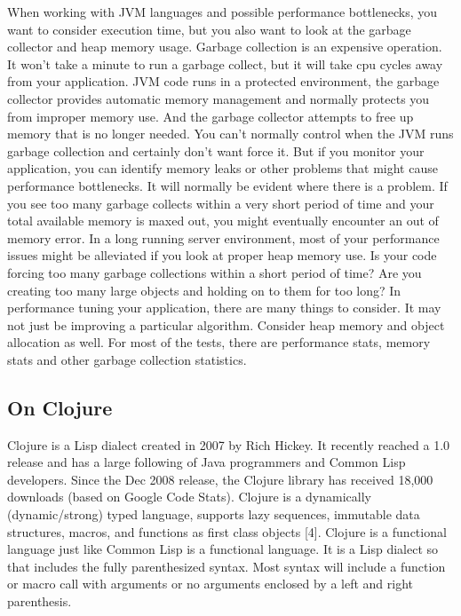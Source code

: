 When working with JVM languages and possible performance bottlenecks, you want to consider execution time, but you also want to look at the garbage collector and heap memory usage. Garbage collection is an expensive operation. It won't take a minute to run a garbage collect, but it will take cpu cycles away from your application. JVM code runs in a protected environment, the garbage collector provides automatic memory management and normally protects you from improper memory use. And the garbage collector attempts to free up memory that is no longer needed. You can't normally control when the JVM runs garbage collection and certainly don't want force it. But if you monitor your application, you can identify memory leaks or other problems that might cause performance bottlenecks. It will normally be evident where there is a problem. If you see too many garbage collects within a very short period of time and your total available memory is maxed out, you might eventually encounter an out of memory error. In a long running server environment, most of your performance issues might be alleviated if you look at proper heap memory use. Is your code forcing too many garbage collections within a short period of time? Are you creating too many large objects and holding on to them for too long? In performance tuning your application, there are many things to consider. It may not just be improving a particular algorithm. Consider heap memory and object allocation as well. For most of the tests, there are performance stats, memory stats and other garbage collection statistics.

\subsection{On Clojure}

Clojure is a Lisp dialect created in 2007 by Rich Hickey. It recently reached a 1.0 release and has a large following of Java programmers and Common Lisp developers. Since the Dec 2008 release, the Clojure library has received 18,000 downloads (based on Google Code Stats). Clojure is a dynamically (dynamic/strong) typed language, supports lazy sequences, immutable data structures, macros, and functions as first class objects [4]. Clojure is a functional language just like Common Lisp is a functional language. It is a Lisp dialect so that includes the fully parenthesized syntax. Most syntax will include a function or macro call with arguments or no arguments enclosed by a left and right parenthesis.

